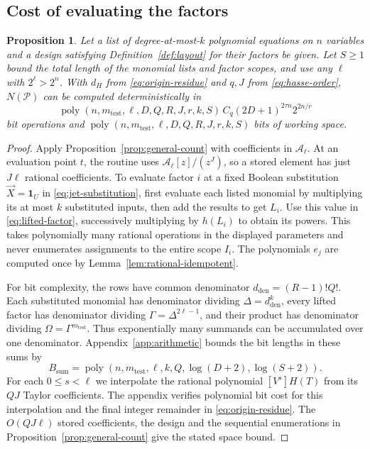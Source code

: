 \documentclass[11pt,reqno]{amsart}
\numberwithin{equation}{section}
\newtheorem{proposition}[theorem]{Proposition}
\theoremstyle{definition}\newtheorem{definition}[theorem]{Definition}
\theoremstyle{remark}\newtheorem{remark}[theorem]{Remark}
\newcommand{\poly}{\operatorname{poly}}
\renewcommand{\le}{\leqslant}
\renewcommand{\ge}{\geqslant}
\begin{document}
\subsection{Cost of evaluating the factors}\label{subsec:one-query-cost}
\begin{proposition}\label{prop:count}
Let a list of degree-at-most-$k$ polynomial equations on $n$ variables
and a design satisfying Definition~\ref{def:layout} for their factors
be given. Let $S\ge1$ bound the total length of the monomial lists and
factor scopes, and use any $\ell$ with $2^\ell>2^n$. With $d_H$ from
\eqref{eq:origin-residue} and $q,J$ from \eqref{eq:hasse-order},
$N(\mathcal P)$ can be computed deterministically in
\[
 \poly(n,m_{\mathrm{test}},\ell,D,Q,R,J,r,k,S)\,
 C_q(2D+1)^{2\tau n}2^{2n/r}
\]
bit operations and $\poly(n,m_{\mathrm{test}},\ell,D,Q,R,J,r,k,S)$
bits of working space.
\end{proposition}
\begin{proof}
Apply Proposition~\ref{prop:general-count} with coefficients in
$\mathcal A_\ell$. At an evaluation point $t$, the routine uses
$\mathcal A_\ell[z]/(z^J)$, so a stored element has just $J\ell$
rational coefficients. To evaluate factor $i$ at a fixed Boolean
substitution $\vec X=\mathbf1_U$ in \eqref{eq:jet-substitution}, first
evaluate each listed monomial by multiplying its at most $k$ substituted
inputs, then add the results to get $L_i$. Use this value in
\eqref{eq:lifted-factor}, successively multiplying by $h(L_i)$ to
obtain its powers. This takes polynomially many rational operations in
the displayed parameters and never enumerates assignments to the entire
scope $I_i$. The polynomials $e_j$ are computed once by
Lemma~\ref{lem:rational-idempotent}.

For bit complexity, the rows have common denominator
$d_{\mathrm{den}}=(R-1)!Q!$. Each substituted monomial has denominator
dividing $\Delta=d_{\mathrm{den}}^k$, every lifted factor has denominator
dividing $\Gamma=\Delta^{2\ell-1}$, and their product has denominator
dividing $\Omega=\Gamma^{m_{\mathrm{test}}}$. Thus exponentially many
summands can be accumulated over one denominator.
Appendix~\ref{app:arithmetic} bounds the bit lengths in these sums by
\begin{equation}\label{eq:sum-bit-bound}
 B_{\mathrm{sum}}=\poly(n,m_{\mathrm{test}},\ell,k,Q,\log(D+2),\log(S+2)).
\end{equation}
For each $0\le s<\ell$ we interpolate the rational polynomial
$[V^s]H(T)$ from its $QJ$ Taylor coefficients. The appendix verifies
polynomial bit cost for this interpolation and the final integer
remainder in \eqref{eq:origin-residue}. The $O(QJ\ell)$ stored
coefficients, the design and the sequential enumerations in
Proposition~\ref{prop:general-count} give the stated space bound.
\end{proof}
\end{document}
